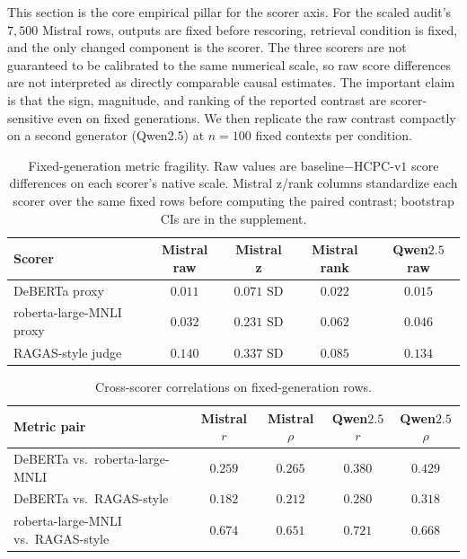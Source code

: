 This section is the core empirical pillar for the scorer axis. For the
scaled audit's $7{,}500$ Mistral rows, outputs are fixed before
rescoring, retrieval condition is fixed, and the only changed component
is the scorer. The three scorers are not guaranteed to be calibrated to
the same numerical scale, so raw score differences are not interpreted
as directly comparable causal estimates. The important claim is that
the sign, magnitude, and ranking of the reported contrast are
scorer-sensitive even on fixed generations. We then replicate the raw
contrast compactly on a second generator (Qwen$2.5$) at $n=100$ fixed
contexts per condition.

\begin{table}[!htb]
\centering
\caption{Fixed-generation metric fragility. Raw values are
baseline$-$HCPC-v$1$ score differences on each scorer's native scale.
Mistral z/rank columns standardize each scorer over the same fixed rows
before computing the paired contrast; bootstrap CIs are in the
supplement.}
\label{tab:metric_fragility_main}
\footnotesize
\begin{tabular}{lcccc}
\toprule
Scorer & Mistral raw & Mistral z & Mistral rank & Qwen$2.5$ raw \\
\midrule
DeBERTa proxy & $0.011$ & $0.071$ SD & $0.022$ & $0.015$ \\
roberta-large-MNLI proxy & $0.032$ & $0.231$ SD & $0.062$ & $0.046$ \\
RAGAS-style judge & $0.140$ & $0.337$ SD & $0.085$ & $0.134$ \\
\bottomrule
\end{tabular}
\end{table}

\begin{table}[!htb]
\centering
\caption{Cross-scorer correlations on fixed-generation rows.}
\label{tab:metric_correlations_main}
\footnotesize
\begin{tabular}{lcccc}
\toprule
Metric pair & Mistral $r$ & Mistral $\rho$ & Qwen$2.5$ $r$ & Qwen$2.5$ $\rho$ \\
\midrule
DeBERTa vs.\ roberta-large-MNLI       & $0.259$ & $0.265$ & $0.380$ & $0.429$ \\
DeBERTa vs.\ RAGAS-style              & $0.182$ & $0.212$ & $0.280$ & $0.318$ \\
roberta-large-MNLI vs.\ RAGAS-style   & $0.674$ & $0.651$ & $0.721$ & $0.668$ \\
\bottomrule
\end{tabular}
\end{table}

